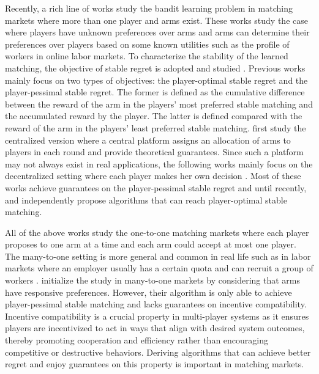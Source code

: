 Recently, a rich line of works study the bandit learning problem in matching markets where more than one player and arms exist. 
These works study the case where players have unknown preferences over arms and arms can determine their preferences over players based on some known utilities such as the profile of workers in online labor markets.
To characterize the stability of the learned matching, the objective of stable regret is adopted and studied \citep{das2005two,liu2020competing,liu2021bandit,sankararaman2021dominate,basu21beyond,kong2022thompson,kong2023player,wang2022bandit}.
Previous works mainly focus on two types of objectives: the player-optimal stable regret and the player-pessimal stable regret. 
The former is defined as the cumulative difference between the reward of the arm in the players' most preferred stable matching and the accumulated reward by the player. 
The latter is defined compared with the reward of the arm in the players' least preferred stable matching. 
\citet{liu2020competing} first study the centralized version where a central platform assigns an allocation of arms to players in each round and provide theoretical guarantees. 
Since such a platform may not always exist in real applications, the following works mainly focus on the decentralized setting where each player makes her own decision \citep{liu2021bandit,sankararaman2021dominate,basu21beyond,kong2022thompson,zhang2022matching,maheshwari2022decentralized,kong2023player}. 
Most of these works achieve guarantees on the player-pessimal stable regret and until recently, \citet{zhang2022matching} and \citet{kong2023player} independently propose algorithms that can reach player-optimal stable matching. 



All of the above works study the one-to-one matching markets where each player proposes to one arm at a time and each arm could accept at most one player. 
The many-to-one setting is more general and common in real life such as in labor markets where an employer usually has a certain quota and can recruit a group of workers \citep{roth1984stability,roth1992two,abdulkadirouglu2005college,che2019stable}. 
\citet{wang2022bandit} initialize the study in many-to-one markets by considering that arms have responsive preferences. 
However, their algorithm is only able to achieve player-pessimal stable matching and lacks guarantees on incentive compatibility.  
Incentive compatibility is a crucial property in multi-player systems as it ensures players are incentivized to act in ways that align with desired system outcomes, thereby promoting cooperation and efficiency rather than encouraging competitive or destructive behaviors. Deriving algorithms that can achieve better regret and enjoy guarantees on this property is important in matching markets. 



